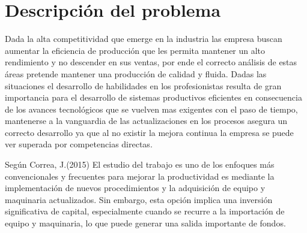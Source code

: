     
    \section{Descripción del problema}
    Dada la alta competitividad que emerge en la industria las empresa buscan aumentar la eficiencia de producción que les permita mantener un alto rendimiento y no descender en sus ventas, por ende el correcto análisis de estas áreas pretende mantener una producción de calidad y fluida. Dadas las situaciones el desarrollo de habilidades en los profesionistas resulta de gran importancia para el desarrollo de sistemas productivos eficientes en consecuencia de los avances tecnológicos que se vuelven mas exigentes con el paso de tiempo, mantenerse a la vanguardia de las actualizaciones en los procesos asegura un correcto desarrollo ya que al no existir la mejora continua la empresa se puede ver superada por competencias directas.  
    
    Según Correa, J.(2015) El estudio del trabajo es uno de los enfoques más convencionales y frecuentes para mejorar la productividad es mediante la implementación de nuevos procedimientos y la adquisición de equipo y maquinaria actualizados. Sin embargo, esta opción implica una inversión significativa de capital, especialmente cuando se recurre a la importación de equipo y maquinaria, lo que puede generar una salida importante de fondos.\cite{REF6}
    
